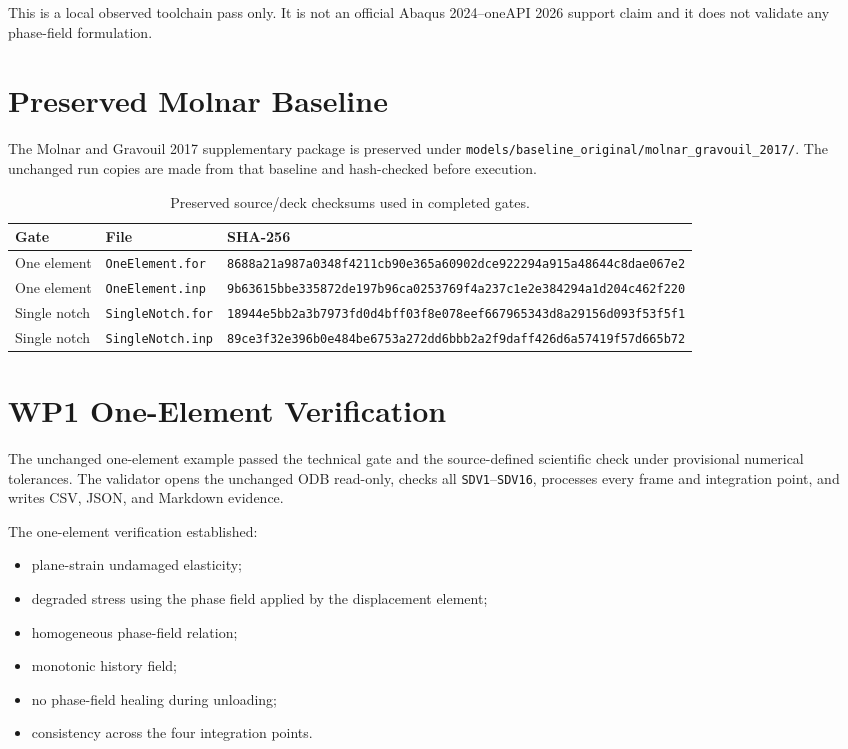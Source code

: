 \documentclass[11pt,a4paper]{article}
\begin{document}
This is a local observed toolchain pass only. It is not an official Abaqus 2024--oneAPI 2026 support claim and it does not validate any phase-field formulation.

\section{Preserved Molnar Baseline}

The Molnar and Gravouil 2017 supplementary package is preserved under \texttt{models/baseline\_original/molnar\_gravouil\_2017/}. The unchanged run copies are made from that baseline and hash-checked before execution.

\begin{table}[H]
\centering
\caption{Preserved source/deck checksums used in completed gates.}
\begin{tabular}{@{}lll@{}}
\toprule
Gate & File & SHA-256 \\
\midrule
One element & \texttt{OneElement.for} & \texttt{8688a21a987a0348f4211cb90e365a60902dce922294a915a48644c8dae067e2} \\
One element & \texttt{OneElement.inp} & \texttt{9b63615bbe335872de197b96ca0253769f4a237c1e2e384294a1d204c462f220} \\
Single notch & \texttt{SingleNotch.for} & \texttt{18944e5bb2a3b7973fd0d4bff03f8e078eef667965343d8a29156d093f53f5f1} \\
Single notch & \texttt{SingleNotch.inp} & \texttt{89ce3f32e396b0e484be6753a272dd6bbb2a2f9daff426d6a57419f57d665b72} \\
\bottomrule
\end{tabular}
\end{table}

\section{WP1 One-Element Verification}

The unchanged one-element example passed the technical gate and the source-defined scientific check under provisional numerical tolerances. The validator opens the unchanged ODB read-only, checks all \texttt{SDV1}--\texttt{SDV16}, processes every frame and integration point, and writes CSV, JSON, and Markdown evidence.

The one-element verification established:
\begin{itemize}
  \item plane-strain undamaged elasticity;
  \item degraded stress using the phase field applied by the displacement element;
  \item homogeneous phase-field relation;
  \item monotonic history field;
  \item no phase-field healing during unloading;
  \item consistency across the four integration points.
\end{itemize}
\end{document}
